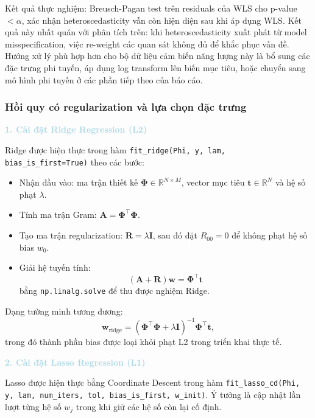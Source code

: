 Kết quả thực nghiệm: Breusch-Pagan test trên residuals của WLS cho p-value $< \alpha$, xác nhận heteroscedasticity vẫn còn hiện diện sau khi áp dụng WLS. Kết quả này nhất quán với phân tích trên: khi heteroscedasticity xuất phát từ model misspecification, việc re-weight các quan sát không đủ để khắc phục vấn đề. Hướng xử lý phù hợp hơn cho bộ dữ liệu cảm biến năng lượng này là bổ sung các đặc trưng phi tuyến, áp dụng log transform lên biến mục tiêu, hoặc chuyển sang mô hình phi tuyến ở các phần tiếp theo của báo cáo.

\subsubsection{Hồi quy có regularization và lựa chọn đặc trưng}
\noindent\textcolor{lightblue}{\textbf{1. Cài đặt Ridge Regression (L2)}}

Ridge được hiện thực trong hàm \texttt{fit\_ridge(Phi, y, lam, bias\_is\_first=True)} theo các bước:
\begin{itemize} [labelsep=10pt, leftmargin=2cm]
    \item Nhận đầu vào: ma trận thiết kế $\mathbf{\Phi}\in\mathbb{R}^{N\times M}$, vector mục tiêu $\mathbf{t}\in\mathbb{R}^{N}$ và hệ số phạt $\lambda$.
    \item Tính ma trận Gram: $\mathbf{A}=\mathbf{\Phi}^{\top}\mathbf{\Phi}$.
    \item Tạo ma trận regularization: $\mathbf{R}=\lambda\mathbf{I}$, sau đó đặt $R_{00}=0$ để không phạt hệ số bias $w_0$.
    \item Giải hệ tuyến tính:
    \begin{equation}
    (\mathbf{A}+\mathbf{R})\mathbf{w}=\mathbf{\Phi}^{\top}\mathbf{t}
    \end{equation}
    bằng \texttt{np.linalg.solve} để thu được nghiệm Ridge.
\end{itemize}

Dạng tường minh tương đương:
\begin{equation}
\mathbf{w}_{\text{ridge}} = (\mathbf{\Phi}^{\top}\mathbf{\Phi}+\lambda\mathbf{I})^{-1}\mathbf{\Phi}^{\top}\mathbf{t},
\end{equation}
trong đó thành phần bias được loại khỏi phạt L2 trong triển khai thực tế.

\noindent\textcolor{lightblue}{\textbf{2. Cài đặt Lasso Regression (L1)}}

Lasso được hiện thực bằng Coordinate Descent trong hàm
\texttt{fit\_lasso\_cd(Phi, y, lam, num\_iters, tol, bias\_is\_first, w\_init)}.
Ý tưởng là cập nhật lần lượt từng hệ số $w_j$ trong khi giữ các hệ số còn lại cố định.

